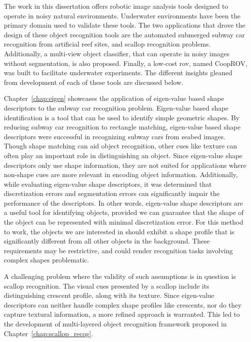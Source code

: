 \documentclass {udthesis}
\begin{document}

The work in this dissertation offers robotic image analysis tools designed to operate in noisy natural environments. 
Underwater environments have been the primary domain used to validate these tools.
The two applications that drove the design of these object recognition tools are the automated submerged subway car recognition
from artificial reef sites, and scallop recognition problems.
Additionally, a multi-view object classifier, that can operate in noisy images without segmentation, is also proposed.
Finally, a low-cost \gls{rov}, named CoopROV, was built to facilitate underwater experiments. The different insights gleaned from development of each of these tools are discussed below.

Chapter~\ref{chap:eigen} showcases the application of eigen-value based shape descriptors to the subway car recognition problem. 
Eigen-value based shape identification is a tool that can be used to identify simple geometric shapes. 
By reducing subway car recognition to rectangle matching, eigen-value based shape descriptors were
successful in recognizing subway cars from seabed images.
Though shape matching can aid object recognition, other cues like texture can often play an important role
in distinguishing an object. Since eigen-value shape descriptors only use shape information, 
they are not suited for applications where non-shape cues are more relevant in encoding object information. 
Additionally, while evaluating eigen-value shape descriptors, it was determined that 
discretization errors and segmentation errors can significantly impair the performance of the descriptors.
In other words, eigen-value shape descriptors are a useful tool for identifying
objects, provided we can guarantee that the shape of the object can be represented with minimal discretization error. 
For this method to work, the objects
we are interested in should exhibit a shape profile that is significantly different from
all other objects in the background. These requirements may be restrictive, and could render recognition tasks involving 
complex shapes problematic. 

A challenging problem where the validity of such assumptions is in question is scallop recognition.
The visual cues presented by a scallop include its distinguishing crescent profile, along with its texture.
Since eigen-value descriptors can neither handle complex shape profiles like crescents, nor do they capture textural information,
a more refined approach is warranted.
This led to the development of multi-layered object recognition framework proposed in Chapter~\ref{chap:scallop_recog}.
\end{document}
